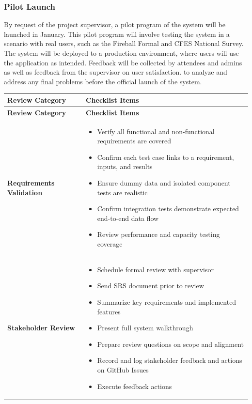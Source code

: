 \documentclass[12pt, titlepage]{article}
\begin{document}
\subsubsection{Pilot Launch}
  By request of the project supervisor, a pilot program of the system will be launched in January. This pilot program will involve testing the system in a scenario with real users, such as the Fireball Formal and CFES National Survey. The system will be deployed to a production environment, where users will use the application as intended. Feedback will be collected by attendees and admins as well as feedback from the supervisor on user satisfaction. to analyze and address any final problems before the official launch of the system.

\begin{longtable}{|p{4cm}|p{11cm}|}
\hline
\textbf{Review Category} & \textbf{Checklist Items} \\
\hline
\endfirsthead

\hline
\textbf{Review Category} & \textbf{Checklist Items} \\
\hline
\endhead

\textbf{Requirements Validation} &
\begin{itemize}
  \item Verify all functional and non-functional requirements are covered
  \item Confirm each test case links to a requirement, inputs, and results
  \item Ensure dummy data and isolated component tests are realistic
  \item Confirm integration tests demonstrate expected end-to-end data flow
  \item Review performance and capacity testing coverage
\end{itemize}
\\
\hline

\textbf{Stakeholder Review} &
\begin{itemize}
  \item Schedule formal review with supervisor
  \item Send SRS document prior to review
  \item Summarize key requirements and implemented features
  \item Present full system walkthrough
  \item Prepare review questions on scope and alignment
  \item Record and log stakeholder feedback and actions on GitHub Issues
  \item Execute feedback actions
\end{itemize}
\\
\hline


\end{longtable}
\end{document}
